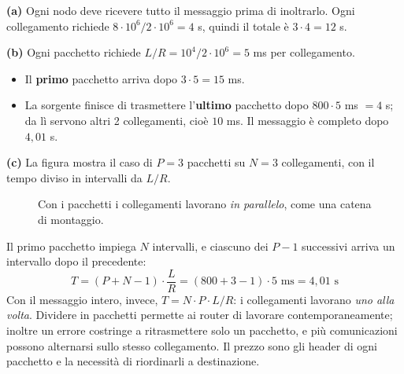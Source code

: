 \svolgimento
\textbf{(a)} Ogni nodo deve ricevere tutto il messaggio prima di inoltrarlo. Ogni collegamento richiede
$8\cdot 10^6 / 2\cdot 10^6 = 4$ s, quindi il totale è $3 \cdot 4 = 12$ s.

\textbf{(b)} Ogni pacchetto richiede $L/R = 10^4 / 2\cdot 10^6 = 5$ ms per collegamento.
\begin{itemize}
    \item Il \textbf{primo} pacchetto arriva dopo $3 \cdot 5 = 15$ ms.
    \item La sorgente finisce di trasmettere l'\textbf{ultimo} pacchetto dopo $800 \cdot 5$ ms $= 4$ s; da lì servono altri 2
          collegamenti, cioè $10$ ms. Il messaggio è completo dopo $4{,}01$ s.
\end{itemize}

\textbf{(c)} La figura mostra il caso di $P = 3$ pacchetti su $N = 3$ collegamenti, con il tempo diviso in intervalli da $L/R$.

\begin{figure}[H]
\centering
{}
\caption{Con i pacchetti i collegamenti lavorano \emph{in parallelo}, come una catena di montaggio.}
\end{figure}

Il primo pacchetto impiega $N$ intervalli, e ciascuno dei $P-1$ successivi arriva un intervallo dopo il precedente:
$$T = (P + N - 1)\cdot\frac{L}{R} = (800 + 3 - 1) \cdot 5 \text{ ms} = 4{,}01 \text{ s}$$
Con il messaggio intero, invece, $T = N \cdot P \cdot L/R$: i collegamenti lavorano \emph{uno alla volta}. Dividere in pacchetti
permette ai router di lavorare contemporaneamente; inoltre un errore costringe a ritrasmettere solo un pacchetto, e più
comunicazioni possono alternarsi sullo stesso collegamento. Il prezzo sono gli header di ogni pacchetto e la necessità di
riordinarli a destinazione.

